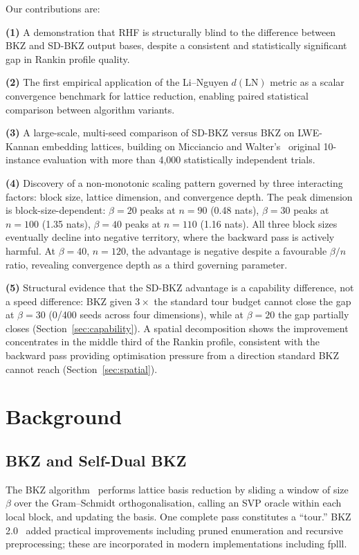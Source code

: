 \documentclass[journal=cic,version=preprint]{iacrj}
\begin{document}
Our contributions are:

\textbf{(1)} A demonstration that RHF is structurally blind to the difference between BKZ and SD-BKZ output bases, despite a consistent and statistically significant gap in Rankin profile quality.

\textbf{(2)} The first empirical application of the Li--Nguyen $d(\mathrm{LN})$ metric as a scalar convergence benchmark for lattice reduction, enabling paired statistical comparison between algorithm variants.

\textbf{(3)} A large-scale, multi-seed comparison of SD-BKZ versus BKZ on LWE-Kannan embedding lattices, building on Micciancio and Walter's~\cite{EC:MicWal16} original 10-instance evaluation with more than 4{,}000 statistically independent trials.

\textbf{(4)} Discovery of a non-monotonic scaling pattern governed by three interacting factors: block size, lattice dimension, and convergence depth. The peak dimension is block-size-dependent: $\beta=20$ peaks at $n=90$ (0.48 nats), $\beta=30$ peaks at $n=100$ (1.35 nats), $\beta=40$ peaks at $n=110$ (1.16 nats). All three block sizes eventually decline into negative territory, where the backward pass is actively harmful. At $\beta=40$, $n=120$, the advantage is negative despite a favourable $\beta/n$ ratio, revealing convergence depth as a third governing parameter.

\textbf{(5)} Structural evidence that the SD-BKZ advantage is a capability difference, not a speed difference: BKZ given $3\times$ the standard tour budget cannot close the gap at $\beta=30$ (0/400 seeds across four dimensions), while at $\beta=20$ the gap partially closes (Section~\ref{sec:capability}). A spatial decomposition shows the improvement concentrates in the middle third of the Rankin profile, consistent with the backward pass providing optimisation pressure from a direction standard BKZ cannot reach (Section~\ref{sec:spatial}).

\section{Background}
\label{sec:background}

\subsection{BKZ and Self-Dual BKZ}

The BKZ algorithm~\cite{MathProg:SchEuc94} performs lattice basis reduction by sliding a window of size $\beta$ over the Gram--Schmidt orthogonalisation, calling an SVP oracle within each local block, and updating the basis. One complete pass constitutes a ``tour.'' BKZ 2.0~\cite{AC:CheNgu11} added practical improvements including pruned enumeration and recursive preprocessing; these are incorporated in modern implementations including fplll.
\end{document}
